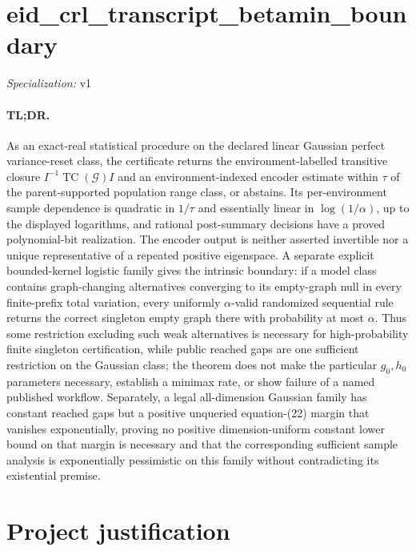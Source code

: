 \documentclass{article}
\begin{document}
\sloppy

\section*{eid\_\allowbreak{}crl\_\allowbreak{}transcript\_\allowbreak{}betamin\_\allowbreak{}boundary}

\noindent\textit{Specialization:} v1\par

\paragraph{TL;DR.} As an exact-real statistical procedure on the declared linear Gaussian perfect variance-reset class, the certificate returns the environment-labelled transitive closure \(I^{-1}\operatorname{TC}(\mathcal G)I\) and an environment-indexed encoder estimate within \(\tau\) of the parent-supported population range class, or abstains. Its per-environment sample dependence is quadratic in \(1/\tau\) and essentially linear in \(\log(1/\alpha)\), up to the displayed logarithms, and rational post-summary decisions have a proved polynomial-bit realization. The encoder output is neither asserted invertible nor a unique representative of a repeated positive eigenspace. A separate explicit bounded-kernel logistic family gives the intrinsic boundary: if a model class contains graph-changing alternatives converging to its empty-graph null in every finite-prefix total variation, every uniformly \(\alpha\)-valid randomized sequential rule returns the correct singleton empty graph there with probability at most \(\alpha\). Thus some restriction excluding such weak alternatives is necessary for high-probability finite singleton certification, while public reached gaps are one sufficient restriction on the Gaussian class; the theorem does not make the particular \(g_0,h_0\) parameters necessary, establish a minimax rate, or show failure of a named published workflow. Separately, a legal all-dimension Gaussian family has constant reached gaps but a positive unqueried equation-(22) margin that vanishes exponentially, proving no positive dimension-uniform constant lower bound on that margin is necessary and that the corresponding sufficient sample analysis is exponentially pessimistic on this family without contradicting its existential premise.

\section{Project justification}
\end{document}
